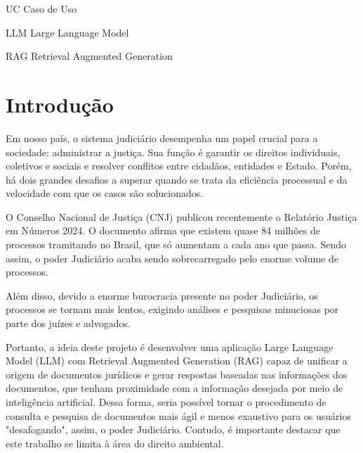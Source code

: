 \documentclass[
	12pt,				%
	openright,			%
	oneside,			    %
	a4paper,				%
	english,			%
	french,			%
	spanish,			%
	brazil			%
	]{abntex2}
\begin{document}
\begin{siglas}
  \item[UC] Caso de Uso
  \item [LLM] Large Language Model
  \item [RAG] Retrieval Augmented Generation
\end{siglas}

\tableofcontents*
\cleardoublepage



\textual


\chapter{Introdução}
Em nosso país, o sistema judiciário desempenha um papel crucial para a sociedade: administrar a justiça. Sua função é garantir os direitos individuais, coletivos e sociais e resolver conflitos entre cidadãos, entidades e Estado. Porém, há dois grandes desafios a superar quando se trata da eficiência processual e da velocidade com que os casos são solucionados.

O Conselho Nacional de Justiça (CNJ) publicou recentemente o Relatório Justiça em Números 2024. O documento afirma que existem quase  84 milhões de processos tramitando no Brasil, que só aumentam a cada ano que passa\cite{CNJ2024}. Sendo assim, o poder Judiciário acaba sendo sobrecarregado pelo enorme volume de processos.

Além disso, devido a enorme burocracia presente no poder Judiciário, os processos se tornam mais lentos, exigindo análises e pesquisas minuciosas por parte dos juízes e advogados.

Portanto, a ideia deste projeto é desenvolver uma aplicação  Large Language Model (LLM) com Retrieval Augmented Generation (RAG) capaz de unificar a origem de documentos jurídicos e gerar respostas baseadas nas informações dos documentos, que tenham proximidade com a informação desejada por meio de inteligência artificial. Dessa forma, seria possível tornar o procedimento de consulta e pesquisa de documentos mais ágil e menos exaustivo para os usuários "desafogando", assim, o poder Judiciário. Contudo, é importante destacar que este trabalho se limita à área do direito ambiental.
\end{document}
